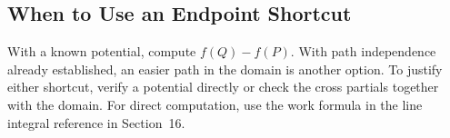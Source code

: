 \subsection{When to Use an Endpoint Shortcut}
With a known potential, compute $f(Q) - f(P)$. With path independence already established, an easier path in the domain is another option. To justify either shortcut, verify a potential directly or check the cross partials together with the domain. For direct computation, use the work formula in the line integral reference in Section~16.
